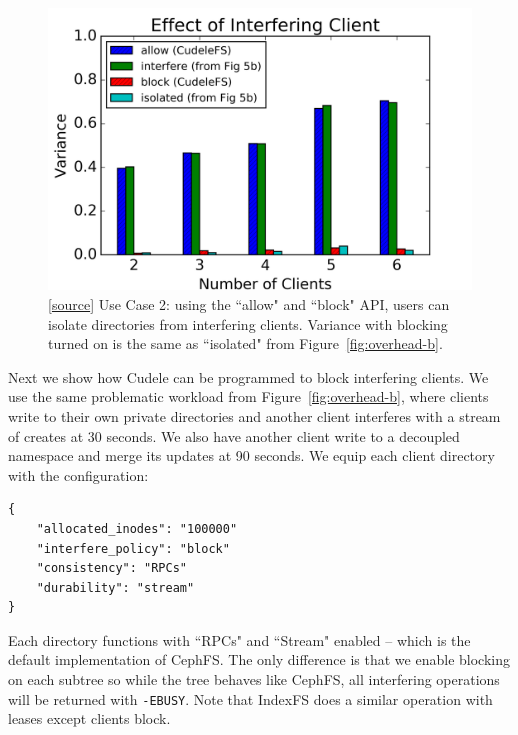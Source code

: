 \begin{figure}[tb]
\centering
\includegraphics[width=1.0\linewidth]{graphs/slowdown-allow-block.png}
\caption{ [\href{https://...}{source}] Use Case 2: using the ``allow" and
``block" API, users can isolate directories from interfering clients. Variance
with blocking turned on is the same as ``isolated" from
Figure~\ref{fig:overhead-b}.
\label{fig:slowdown-allow-block}}

\end{figure}

Next we show how Cudele can be programmed to block interfering clients. We
use the same problematic workload from Figure~\ref{fig:overhead-b}, where
clients write to their own private directories and another client interferes with a stream of creates at
30 seconds.  We also have another client write to a decoupled namespace and
merge its updates at 90 seconds.  We equip each client directory with the
configuration:

\begin{listing}[tb]
\begin{verbatim}
{     
    "allocated_inodes": "100000"
    "interfere_policy": "block"
    "consistency": "RPCs"
    "durability": "stream"
}
\end{verbatim}
\end{listing}

Each directory functions with ``RPCs"
and ``Stream" enabled -- which is the default implementation of CephFS. The only
difference is that we enable blocking on each subtree so while the tree behaves
like CephFS, all interfering operations will be returned with \texttt{-EBUSY}.
Note that IndexFS does a similar operation with leases except clients block.


